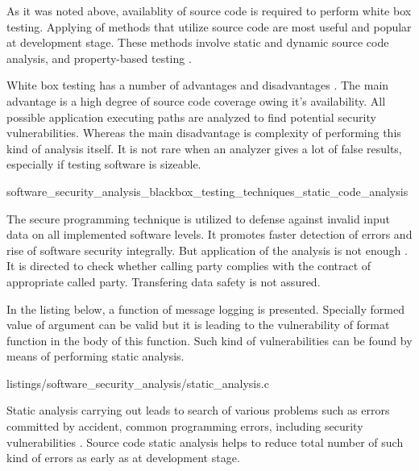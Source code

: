 %
As it was noted above, availablity of source code is required to perform white box testing. 
%
Applying of methods that utilize source code are most useful and popular at development stage. 
%
These methods involve static and dynamic source code analysis, and property-based testing . 

%
White box testing has a number of advantages and disadvantages . 
%
The main advantage is a high degree of source code coverage owing it's availability. 
%
All possible application executing paths are analyzed to find potential security vulnerabilities. 
%
Whereas the main disadvantage is complexity of performing this kind of analysis itself. 
%
It is not rare when an analyzer gives a lot of false results, especially if testing software is sizeable. 


	{software_security_analysis_blackbox_testing_techniques_static_code_analysis}

%
The secure programming technique  is utilized to defense against invalid input data on all implemented software levels. 
%
It promotes faster detection of errors and rise of software security integrally. 
%
But application of the analysis is not enough . 
%
It is directed to check whether calling party complies with the contract of appropriate called party. 
%
Transfering data safety is not assured. 

%
In the listing below, a function of message logging is presented. 
%
Specially formed value of  argument can be valid but it is leading to the vulnerability of  format function in the body of this function. 
%
Such kind of vulnerabilities can be found by means of performing static analysis. 

	{listings/software_security_analysis/static_analysis.c}

%
Static analysis carrying out leads to search of various problems such as errors committed by accident, common programming errors, including security vulnerabilities . 
%
Source code static analysis helps to reduce \A total number of such kind of errors as early as at development stage. 

